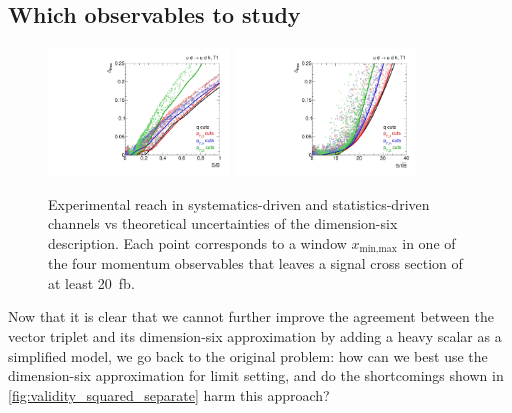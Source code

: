 \subsection{Which observables to study}

\begin{figure}[t]
  \includegraphics[width=0.43\textwidth]{fig/validity/WBF_cuts_T1_SB.pdf}
  \hspace*{0.05\textwidth}
  \includegraphics[width=0.43\textwidth]{fig/validity/WBF_cuts_T1_SsqrtB.pdf}
  \caption{Experimental reach in systematics-driven and
    statistics-driven channels vs theoretical uncertainties of the
    dimension-six description. Each point corresponds to a window
    $x_\text{min,max}$ in one of the four momentum observables that leaves a signal
    cross section of at least 20~fb.}
  \label{fig:validity_cuts}
\end{figure}

Now that it is clear that we cannot further improve the agreement
between the vector triplet and its dimension-six approximation by adding
a heavy scalar as a simplified model, we go back to the original
problem: how can we best use the dimension-six approximation for limit
setting, and do the shortcomings shown in
\autoref{fig:validity_squared_separate} harm this approach?

